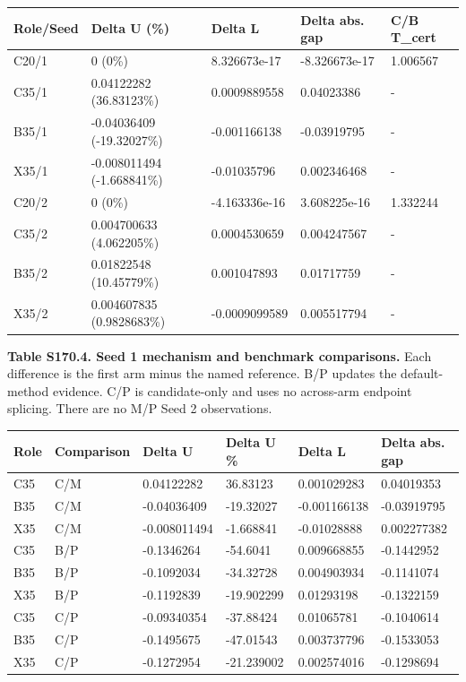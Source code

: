 \documentclass[
  american,
  11pt,
]{article}
\newcounter{none} %
\begin{document}
{\def\LTcaptype{none} %
\begin{longtable}[]{@{}lllll@{}}
\toprule\noalign{}
Role/Seed & Delta U (\%) & Delta L & Delta abs. gap & C/B T\_\allowbreak{}cert \\
\midrule\noalign{}
\endhead
\bottomrule\noalign{}
\endlastfoot
C20/1 & 0 (0\%) & 8.326673e-17 & -8.326673e-17 & 1.006567 \\
C35/1 & 0.04122282 (36.83123\%) & 0.0009889558 & 0.04023386 & - \\
B35/1 & -0.04036409 (-19.32027\%) & -0.001166138 & -0.03919795 & - \\
X35/1 & -0.008011494 (-1.668841\%) & -0.01035796 & 0.002346468 & - \\
C20/2 & 0 (0\%) & -4.163336e-16 & 3.608225e-16 & 1.332244 \\
C35/2 & 0.004700633 (4.062205\%) & 0.0004530659 & 0.004247567 & - \\
B35/2 & 0.01822548 (10.45779\%) & 0.001047893 & 0.01717759 & - \\
X35/2 & 0.004607835 (0.9828683\%) & -0.0009099589 & 0.005517794 & - \\
\end{longtable}
}


\textbf{Table S170.4. Seed 1 mechanism and benchmark comparisons.} Each
difference is the first arm minus the named reference. B/P updates the
default-method evidence. C/P is candidate-only and uses no across-arm
endpoint splicing. There are no M/P Seed 2 observations.

{\def\LTcaptype{none} %
\begin{longtable}[]{@{}llllll@{}}
\toprule\noalign{}
Role & Comparison & Delta U & Delta U \% & Delta L & Delta abs. gap \\
\midrule\noalign{}
\endhead
\bottomrule\noalign{}
\endlastfoot
C35 & C/M & 0.04122282 & 36.83123 & 0.001029283 & 0.04019353 \\
B35 & C/M & -0.04036409 & -19.32027 & -0.001166138 & -0.03919795 \\
X35 & C/M & -0.008011494 & -1.668841 & -0.01028888 & 0.002277382 \\
C35 & B/P & -0.1346264 & -54.6041 & 0.009668855 & -0.1442952 \\
B35 & B/P & -0.1092034 & -34.32728 & 0.004903934 & -0.1141074 \\
X35 & B/P & -0.1192839 & -19.902299 & 0.01293198 & -0.1322159 \\
C35 & C/P & -0.09340354 & -37.88424 & 0.01065781 & -0.1040614 \\
B35 & C/P & -0.1495675 & -47.01543 & 0.003737796 & -0.1533053 \\
X35 & C/P & -0.1272954 & -21.239002 & 0.002574016 & -0.1298694 \\
\end{longtable}
}
\end{document}
